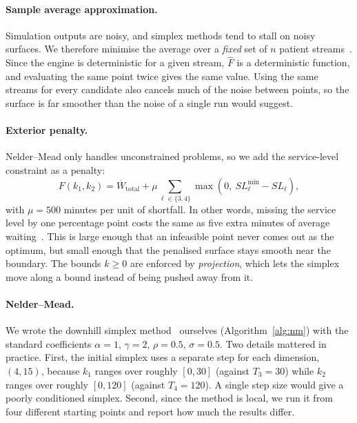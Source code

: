 \documentclass[sigconf,nonacm]{acmart}
\begin{document}
\paragraph{Sample average approximation.}
Simulation outputs are noisy, and simplex methods tend to stall on noisy
surfaces. We therefore minimise the average over a \emph{fixed} set of $n$
patient streams~\cite{kim2015saa}. Since the engine is deterministic for a given
stream, $\hat{F}$ is a deterministic function, and evaluating the same point
twice gives the same value. Using the same streams for every candidate also
cancels much of the noise between points, so the surface is far smoother than
the noise of a single run would suggest.

\paragraph{Exterior penalty.}
Nelder--Mead only handles unconstrained problems, so we add the service-level
constraint as a penalty:
\begin{equation}
F(k_1,k_2) = \overline{W}_{\text{total}}
 + \mu \sum_{\ell\in\{3,4\}} \max\!\left(0,\ SL^{\min}_\ell - SL_\ell\right),
\label{eq:penalty}
\end{equation}
with $\mu = 500$ minutes per unit of shortfall. In other words, missing the
service level by one percentage point costs the same as five extra minutes of
average waiting~\cite{nocedal2006numerical}. This is large enough that an
infeasible point never comes out as the optimum, but small enough that the
penalised surface stays smooth near the boundary. The bounds $k\ge0$ are
enforced by \emph{projection}, which lets the simplex move along a bound
instead of being pushed away from it.

\paragraph{Nelder--Mead.}
We wrote the downhill simplex method~\cite{nelder1965simplex} ourselves
(Algorithm~\ref{alg:nm}) with the standard coefficients $\alpha=1$, $\gamma=2$,
$\rho=0.5$, $\sigma=0.5$. Two details mattered in practice. First, the initial
simplex uses a separate step for each dimension, $(4,15)$, because $k_1$ ranges
over roughly $[0,30]$ (against $T_3=30$) while $k_2$ ranges over roughly
$[0,120]$ (against $T_4=120$). A single step size would give a poorly
conditioned simplex. Second, since the method is local, we run it from four
different starting points and report how much the results differ.
\end{document}
